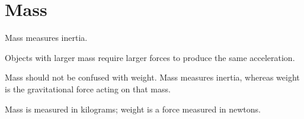 \section{Mass}

Mass measures inertia.

Objects with larger mass require larger forces to produce the same acceleration.

Mass should not be confused with weight. Mass measures inertia, whereas
weight is the gravitational force acting on that mass.

\begin{mistakebox}
Mass is measured in kilograms; weight is a force measured in newtons.
\end{mistakebox}


